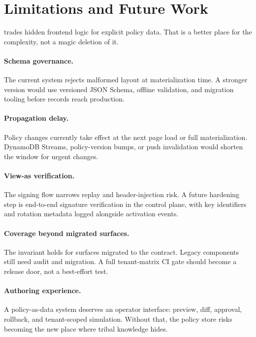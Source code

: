 \section{Limitations and Future Work}
\label{sec:futurework}

\uiPolicy{} trades hidden frontend logic for explicit policy data. That is a better place for the complexity, not a magic deletion of it.

\paragraph{Schema governance.}
The current system rejects malformed layout at materialization time. A stronger version would use versioned JSON Schema, offline validation, and migration tooling before records reach production.

\paragraph{Propagation delay.}
Policy changes currently take effect at the next page load or full materialization. DynamoDB Streams, policy-version bumps, or push invalidation would shorten the window for urgent changes.

\paragraph{View-as verification.}
The signing flow narrows replay and header-injection risk. A future hardening step is end-to-end signature verification in the control plane, with key identifiers and rotation metadata logged alongside activation events.

\paragraph{Coverage beyond migrated surfaces.}
The invariant holds for surfaces migrated to the contract. Legacy components still need audit and migration. A full tenant-matrix CI gate should become a release door, not a best-effort test.

\paragraph{Authoring experience.}
A policy-as-data system deserves an operator interface: preview, diff, approval, rollback, and tenant-scoped simulation. Without that, the policy store risks becoming the new place where tribal knowledge hides.
